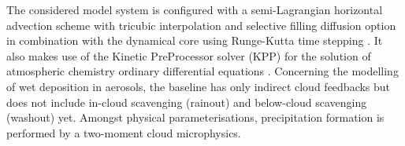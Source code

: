 The   considered  \cosmoart   model  system   is  configured   with  a
semi-Lagrangian   horizontal    advection   sche\-me   with   tricubic
interpolation  and selective filling  diffusion option  in combination
with   the   dynamical    core   using   Runge-Kutta   time   stepping
\cite{COSMO-PartI-2011}.    It   also  makes   use   of  the   Kinetic
PreProcessor solver  (KPP) for  the solution of  atmospheric chemistry
ordinary  differential equations  \cite{Damian-2002}.   Concerning the
modelling  of  wet  deposition  in  aerosols, the  baseline  has  only
indirect  cloud feedbacks  but  does not  include in-cloud  scavenging
(rainout) and below-cloud  scavenging (washout) yet.  Amongst physical
parameterisations,   precipitation  formation   is   performed  by   a
two-moment cloud microphysics.

